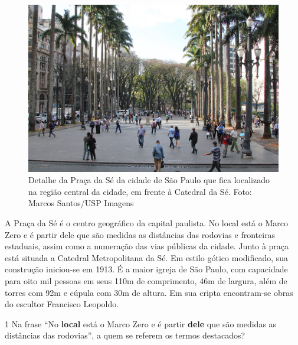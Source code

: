 \begin{myquote}

\begin{figure}[H]
\centering
\includegraphics[scale=0.25]{./imgSAEB_7_POR/media/image54.png}
\caption{Detalhe da Praça da Sé da cidade de São Paulo que fica localizado na região central da cidade, em frente à Catedral da Sé. Foto: Marcos Santos/USP Imagens}
\end{figure}

A Praça da Sé é o centro geográfico da capital paulista. No local está o Marco Zero 
e é partir dele que são medidas as distâncias das rodovias e fronteiras estaduais, 
assim como a numeração das vias públicas da cidade. Junto à praça está situada a 
Catedral Metropolitana da Sé. Em estilo gótico modificado, sua construção iniciou-se em 1913.
É a maior igreja de São Paulo, com capacidade para oito mil pessoas em seus 110m de comprimento, 
46m de largura, além de torres com 92m e cúpula com 30m de altura. Em sua cripta encontram-se
obras do escultor Francisco Leopoldo.


\end{myquote}

\num{1} Na frase ``No \textbf{local} está o Marco Zero e é partir \textbf{dele} que são medidas
as distâncias das rodovias'', a quem se referem os termos destacados?

